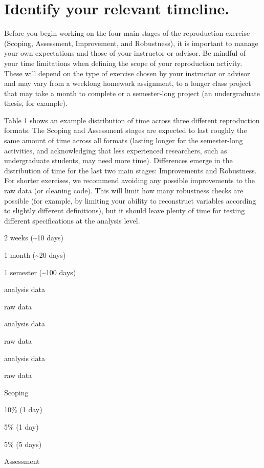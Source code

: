 \documentclass[
]{book}
\begin{document}
\hypertarget{identify-your-relevant-timeline.}{%
\section{Identify your relevant timeline.}\label{identify-your-relevant-timeline.}}

Before you begin working on the four main stages of the reproduction exercise (Scoping, Assessment, Improvement, and Robustness), it is important to manage your own expectations and those of your instructor or advisor. Be mindful of your time limitations when defining the scope of your reproduction activity. These will depend on the type of exercise chosen by your instructor or advisor and may vary from a weeklong homework assignment, to a longer class project that may take a month to complete or a semester-long project (an undergraduate thesis, for example).

Table 1 shows an example distribution of time across three different reproduction formats. The Scoping and Assessment stages are expected to last roughly the same amount of time across all formats (lasting longer for the semester-long activities, and acknowledging that less experienced researchers, such as undergraduate students, may need more time). Differences emerge in the distribution of time for the last two main stages: Improvements and Robustness. For shorter exercises, we recommend avoiding any possible improvements to the raw data (or cleaning code). This will limit how many robustness checks are possible (for example, by limiting your ability to reconstruct variables according to slightly different definitions), but it should leave plenty of time for testing different specifications at the analysis level.

2 weeks (\textasciitilde10 days)

1 month (\textasciitilde20 days)

1 semester (\textasciitilde100 days)

analysis data

raw data

analysis data

raw data

analysis data

raw data

Scoping

10\% (1 day)

5\% (1 day)

5\% (5 days)

Assessment
\end{document}
